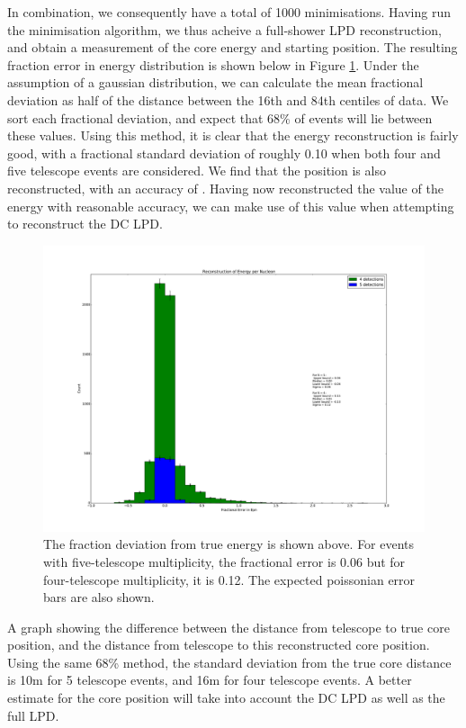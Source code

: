 \documentclass[11pt]{article}
\begin{document}
In combination, we consequently have a total of 1000 minimisations. Having run the minimisation algorithm, we thus acheive a full-shower LPD reconstruction, and obtain a measurement of the core energy and starting position. The resulting fraction error in energy distribution is shown below in Figure \ref{fig:rawepn}. Under the assumption of a gaussian distribution, we can calculate the mean fractional deviation as half of the distance between the 16th and 84th centiles of data. We sort each fractional deviation, and expect that 68\% of events will lie between these values. Using this method, it is clear that the energy reconstruction is fairly good, with a fractional standard deviation of roughly 0.10 when both four and five telescope events are considered. We find that the position is also reconstructed, with an accuracy of . Having now reconstructed the value of the energy with reasonable accuracy, we can make use of this value when attempting to reconstruct the DC LPD. 

\begin{figure}
\begin{center}
\includegraphics[width=\textwidth]{rawepn}
\caption{The fraction deviation from true energy is shown above. For events with five-telescope multiplicity, the fractional error is 0.06 but for four-telescope multiplicity, it is 0.12. The expected poissonian error bars are also shown.}
\label{fig:rawepn}
\end{center}
\end{figure}

A graph showing the difference between the distance from telescope to true core position, and the distance from telescope to this reconstructed core position. Using the same 68\% method, the standard deviation from the true core distance  is 10m for 5 telescope events, and 16m for four telescope events. A better estimate for the core position will take into account the DC LPD as well as the full LPD.
\end{document}
